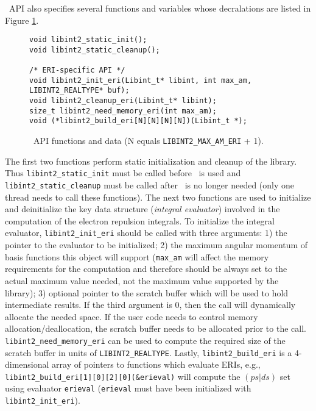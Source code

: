 \documentclass[12pt]{article}
\begin{document}
\LIBINT\ API also specifies several functions and variables whose decralations are listed in Figure \ref{fig:api}.
\begin{figure}
\caption{\label{fig:api} \LIBINT\ API  functions and data (N equals {\tt LIBINT2\_MAX\_AM\_ERI} + 1). }
\begin{center}
\begin{minipage}[t]{0.9\linewidth}
\begin{verbatim}
void libint2_static_init();
void libint2_static_cleanup();

/* ERI-specific API */
void libint2_init_eri(Libint_t* libint, int max_am, LIBINT2_REALTYPE* buf);
void libint2_cleanup_eri(Libint_t* libint);
size_t libint2_need_memory_eri(int max_am);
void (*libint2_build_eri[N][N][N][N])(Libint_t *);
\end{verbatim}
\end{minipage}
\end{center}
\end{figure}
The first two functions perform static initialization and cleanup of the library.
Thus {\tt libint2\_static\_init} must be called before \LIBINT\ is used and
{\tt libint2\_static\_cleanup} must be called after \LIBINT\ is no longer needed (only one thread needs to call these functions).
The next two functions are used to initialize and deinitialize the key data
structure ({\em integral evaluator}) involved in the computation of the electron repulsion integrals.
To initialize the integral evaluator, {\tt libint2\_init\_eri} should be called with three arguments:
1) the pointer to the evaluator to be initialized; 2) the maximum angular momentum
of basis functions this object will support ({\tt max\_am} will affect the memory requirements
for the computation and therefore should be always set to the actual maximum value needed,
not the maximum value supported by the library); 3) optional pointer to the scratch buffer
which will be used to hold intermediate results. If the third argument is 0, then
the call will dynamically allocate the needed space. If the user code needs to control
memory allocation/deallocation, the scratch buffer needs to be allocated prior to the call.
{\tt libint2\_need\_memory\_eri} can be used to compute the required size of
the scratch buffer in units of {\tt LIBINT2\_REALTYPE}. Lastly, {\tt libint2\_build\_eri} is a 4-dimensional
array of pointers to functions which evaluate ERIs, e.g., {\tt libint2\_build\_eri[1][0][2][0](\&erieval)}
will compute the $(ps|ds)$ set using evaluator {\tt erieval} ({\tt erieval} must have been initialized
with {\tt libint2\_init\_eri}).
\end{document}
